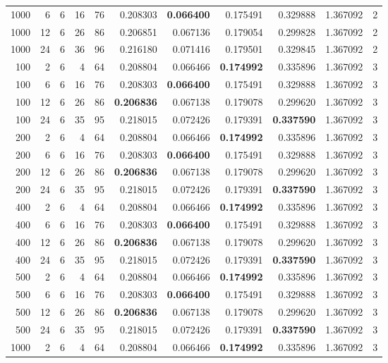 \begin{table}
\begin{tabular}{rrrrrrrrrrr}
1000 & 6 & 6 & 16 & 76 & 0.208303 & \textbf{0.066400} & 0.175491 & 0.329888 & 1.367092 & 2 \\
1000 & 12 & 6 & 26 & 86 & 0.206851 & 0.067136 & 0.179054 & 0.299828 & 1.367092 & 2 \\
1000 & 24 & 6 & 36 & 96 & 0.216180 & 0.071416 & 0.179501 & 0.329845 & 1.367092 & 2 \\
100 & 2 & 6 & 4 & 64 & 0.208804 & 0.066466 & \textbf{0.174992} & 0.335896 & 1.367092 & 3 \\
100 & 6 & 6 & 16 & 76 & 0.208303 & \textbf{0.066400} & 0.175491 & 0.329888 & 1.367092 & 3 \\
100 & 12 & 6 & 26 & 86 & \textbf{0.206836} & 0.067138 & 0.179078 & 0.299620 & 1.367092 & 3 \\
100 & 24 & 6 & 35 & 95 & 0.218015 & 0.072426 & 0.179391 & \textbf{0.337590} & 1.367092 & 3 \\
200 & 2 & 6 & 4 & 64 & 0.208804 & 0.066466 & \textbf{0.174992} & 0.335896 & 1.367092 & 3 \\
200 & 6 & 6 & 16 & 76 & 0.208303 & \textbf{0.066400} & 0.175491 & 0.329888 & 1.367092 & 3 \\
200 & 12 & 6 & 26 & 86 & \textbf{0.206836} & 0.067138 & 0.179078 & 0.299620 & 1.367092 & 3 \\
200 & 24 & 6 & 35 & 95 & 0.218015 & 0.072426 & 0.179391 & \textbf{0.337590} & 1.367092 & 3 \\
400 & 2 & 6 & 4 & 64 & 0.208804 & 0.066466 & \textbf{0.174992} & 0.335896 & 1.367092 & 3 \\
400 & 6 & 6 & 16 & 76 & 0.208303 & \textbf{0.066400} & 0.175491 & 0.329888 & 1.367092 & 3 \\
400 & 12 & 6 & 26 & 86 & \textbf{0.206836} & 0.067138 & 0.179078 & 0.299620 & 1.367092 & 3 \\
400 & 24 & 6 & 35 & 95 & 0.218015 & 0.072426 & 0.179391 & \textbf{0.337590} & 1.367092 & 3 \\
500 & 2 & 6 & 4 & 64 & 0.208804 & 0.066466 & \textbf{0.174992} & 0.335896 & 1.367092 & 3 \\
500 & 6 & 6 & 16 & 76 & 0.208303 & \textbf{0.066400} & 0.175491 & 0.329888 & 1.367092 & 3 \\
500 & 12 & 6 & 26 & 86 & \textbf{0.206836} & 0.067138 & 0.179078 & 0.299620 & 1.367092 & 3 \\
500 & 24 & 6 & 35 & 95 & 0.218015 & 0.072426 & 0.179391 & \textbf{0.337590} & 1.367092 & 3 \\
1000 & 2 & 6 & 4 & 64 & 0.208804 & 0.066466 & \textbf{0.174992} & 0.335896 & 1.367092 & 3 \\

\end{tabular}
\end{table}
